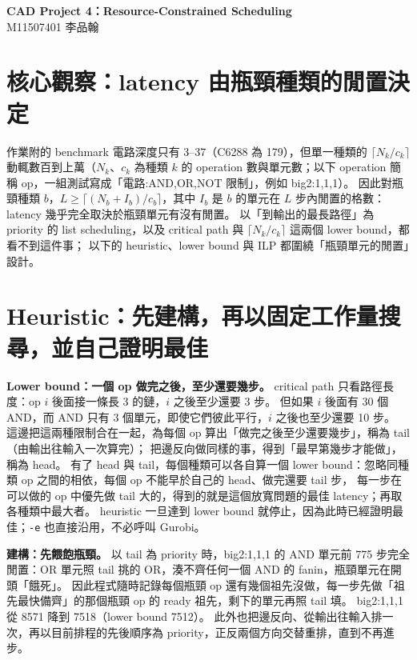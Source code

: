 \documentclass[12pt,a4paper]{article}
\begin{document}
\begin{center}
{\Large\bfseries CAD Project 4：Resource-Constrained Scheduling}\\[0.3em]
M11507401 李品翰
\end{center}

\section{核心觀察：latency 由瓶頸種類的閒置決定}

作業附的 benchmark 電路深度只有 3--37（C6288 為 179），但單一種類的 $\lceil N_k/c_k\rceil$ 動輒數百到上萬（$N_k$、$c_k$ 為種類 $k$ 的 operation 數與單元數；以下 operation 簡稱 op，一組測試寫成「電路:AND,OR,NOT 限制」，例如 big2:1,1,1）。
因此對瓶頸種類 $b$，$L \ge \lceil (N_b + I_b)/c_b \rceil$，其中 $I_b$ 是 $b$ 的單元在 $L$ 步內閒置的格數：
latency 幾乎完全取決於瓶頸單元有沒有閒置。
以「到輸出的最長路徑」為 priority 的 list scheduling，以及 critical path 與 $\lceil N_k/c_k\rceil$ 這兩個 lower bound，都看不到這件事；
以下的 heuristic、lower bound 與 ILP 都圍繞「瓶頸單元的閒置」設計。

\section{Heuristic：先建構，再以固定工作量搜尋，並自己證明最佳}

\textbf{Lower bound：一個 op 做完之後，至少還要幾步。}
critical path 只看路徑長度：op $i$ 後面接一條長 3 的鏈，$i$ 之後至少還要 3 步。
但如果 $i$ 後面有 30 個 AND，而 AND 只有 3 個單元，即使它們彼此平行，$i$ 之後也至少還要 10 步。
這邊把這兩種限制合在一起，為每個 op 算出「做完之後至少還要幾步」，稱為 tail（由輸出往輸入一次算完）；
把邊反向做同樣的事，得到「最早第幾步才能做」，稱為 head。
有了 head 與 tail，每個種類可以各自算一個 lower bound：忽略同種類 op 之間的相依，每個 op 不能早於自己的 head、做完還要 tail 步，
每一步在可以做的 op 中優先做 tail 大的，得到的就是這個放寬問題的最佳 latency；再取各種類中最大者。
heuristic 一旦達到 lower bound 就停止，因為此時已經證明最佳；\texttt{-e} 也直接沿用，不必呼叫 Gurobi。

\textbf{建構：先餵飽瓶頸。}
以 tail 為 priority 時，big2:1,1,1 的 AND 單元前 775 步完全閒置：OR 單元照 tail 挑的 OR，湊不齊任何一個 AND 的 fanin，瓶頸單元在開頭「餓死」。
因此程式隨時記錄每個瓶頸 op 還有幾個祖先沒做，每一步先做「祖先最快備齊」的那個瓶頸 op 的 ready 祖先，剩下的單元再照 tail 填。
big2:1,1,1 從 8571 降到 7518（lower bound 7512）。
此外也把邊反向、從輸出往輸入排一次，再以目前排程的先後順序為 priority，正反兩個方向交替重排，直到不再進步。
\end{document}
